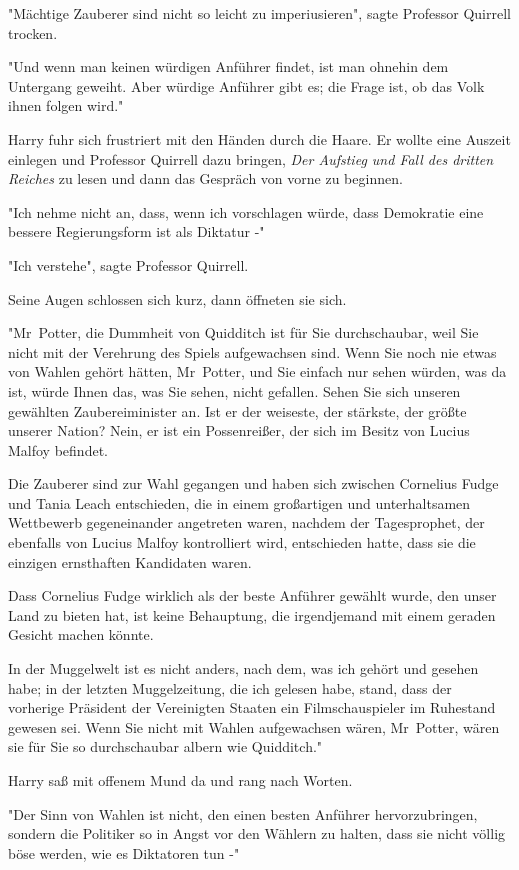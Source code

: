 {"Mächtige Zauberer sind nicht so leicht zu imperiusieren", sagte Professor Quirrell trocken.

"Und wenn man keinen würdigen Anführer findet, ist man ohnehin dem Untergang geweiht. Aber würdige Anführer gibt es; die Frage ist, ob das Volk ihnen folgen wird."

Harry fuhr sich frustriert mit den Händen durch die Haare. Er wollte eine Auszeit einlegen und Professor Quirrell dazu bringen, \emph{Der Aufstieg und Fall des dritten Reiches} zu lesen und dann das Gespräch von vorne zu beginnen.

"Ich nehme nicht an, dass, wenn ich vorschlagen würde, dass Demokratie eine bessere Regierungsform ist als Diktatur -"

"Ich verstehe", sagte Professor Quirrell.

Seine Augen schlossen sich kurz, dann öffneten sie sich.

"Mr~Potter, die Dummheit von Quidditch ist für Sie durchschaubar, weil Sie nicht mit der Verehrung des Spiels aufgewachsen sind. Wenn Sie noch nie etwas von Wahlen gehört hätten, Mr~Potter, und Sie einfach nur sehen würden, was da ist, würde Ihnen das, was Sie sehen, nicht gefallen. Sehen Sie sich unseren gewählten Zaubereiminister an. Ist er der weiseste, der stärkste, der größte unserer Nation? Nein, er ist ein Possenreißer, der sich im Besitz von Lucius Malfoy befindet.

Die Zauberer sind zur Wahl gegangen und haben sich zwischen Cornelius Fudge und Tania Leach entschieden, die in einem großartigen und unterhaltsamen Wettbewerb gegeneinander angetreten waren, nachdem der Tagesprophet, der ebenfalls von Lucius Malfoy kontrolliert wird, entschieden hatte, dass sie die einzigen ernsthaften Kandidaten waren.

Dass Cornelius Fudge wirklich als der beste Anführer gewählt wurde, den unser Land zu bieten hat, ist keine Behauptung, die irgendjemand mit einem geraden Gesicht machen könnte.

In der Muggelwelt ist es nicht anders, nach dem, was ich gehört und gesehen habe; in der letzten Muggelzeitung, die ich gelesen habe, stand, dass der vorherige Präsident der Vereinigten Staaten ein Filmschauspieler im Ruhestand gewesen sei. Wenn Sie nicht mit Wahlen aufgewachsen wären, Mr~Potter, wären sie für Sie so durchschaubar albern wie Quidditch."

Harry saß mit offenem Mund da und rang nach Worten.

"Der Sinn von Wahlen ist nicht, den einen besten Anführer hervorzubringen, sondern die Politiker so in Angst vor den Wählern zu halten, dass sie nicht völlig böse werden, wie es Diktatoren tun -"

}
